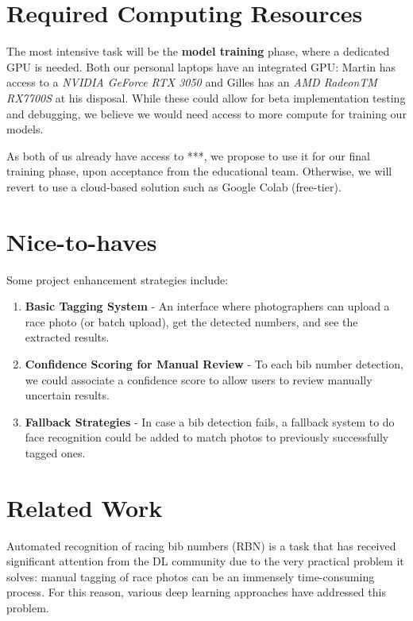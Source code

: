 \documentclass[twocolumn,superscriptaddress,aps]{revtex4-1}
\begin{document}
\section{Required Computing Resources}

 The most intensive task will be the \textbf{model training} phase, where a dedicated GPU  is needed. Both our personal laptops have an integrated GPU: Martin has access to a \textit{NVIDIA GeForce RTX 3050} and Gilles has an \textit{AMD RadeonTM RX7700S} at his disposal. While these could allow for beta implementation testing and debugging, we believe we would need access to more compute for training our models.

As both of us already have access to ***, we propose to use it for our final training phase, upon acceptance from the educational team. Otherwise, we will revert to use a cloud-based solution such as Google Colab (free-tier).


\section{Nice-to-haves}\label{sec:nth}

Some project enhancement strategies include:
\begin{enumerate}
    \item \textbf{Basic Tagging System} - An interface where photographers can upload a race photo (or batch upload), get the detected numbers, and see the extracted results.
    \item \textbf{Confidence Scoring for Manual Review} - To each bib number detection, we could associate a confidence score to allow users to review manually uncertain results.
    \item \textbf{Fallback Strategies} -  In case a bib detection fails, a fallback system to do face recognition could be added to match photos to previously successfully tagged ones.
\end{enumerate}


\section{Related Work}

Automated recognition of racing bib numbers (RBN) is a task that has received significant attention from the DL community due to the very practical problem it solves: manual tagging of race photos can be an immensely time-consuming process. For this reason, various deep learning approaches have addressed this problem.
\end{document}
